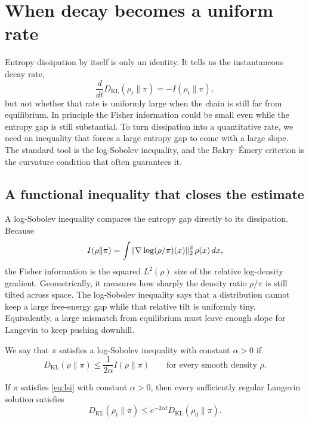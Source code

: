 \documentclass[11pt]{article}
\begin{document}
\section{When decay becomes a uniform rate}
\label{sec:lsi}

Entropy dissipation by itself is only an identity.
It tells us the instantaneous decay rate,
\[
\frac{d}{dt}D_{\mathrm{KL}}(\rho_t\|\pi)=-I(\rho_t\|\pi),
\]
but not whether that rate is uniformly large when the chain is still far from equilibrium.
In principle the Fisher information could be small even while the entropy gap is still substantial.
To turn dissipation into a quantitative rate, we need an inequality that forces a large entropy gap to come with a large slope.
The standard tool is the log-Sobolev inequality, and the Bakry--\'Emery criterion is the curvature condition that often guarantees it.

\subsection{A functional inequality that closes the estimate}
\label{subsec:lsi-decay}

A log-Sobolev inequality compares the entropy gap directly to its dissipation.
Because
\[
I(\rho\|\pi)=\int \lVert\nabla \log(\rho/\pi)(x)\rVert_2^2\,\rho(x)\,dx,
\]
the Fisher information is the squared $L^2(\rho)$ size of the relative log-density gradient.
Geometrically, it measures how sharply the density ratio $\rho/\pi$ is still tilted across space.
The log-Sobolev inequality says that a distribution cannot keep a large free-energy gap while that relative tilt is uniformly tiny.
Equivalently, a large mismatch from equilibrium must leave enough slope for Langevin to keep pushing downhill.

\begin{definition}
\label{def:lsi}
We say that $\pi$ satisfies a log-Sobolev inequality with constant $\alpha>0$ if
\begin{equation}
  D_{\mathrm{KL}}(\rho\|\pi)
  \le
  \frac{1}{2\alpha}I(\rho\|\pi)
  \qquad
  \text{for every smooth density }\rho.
  \label{eq:lsi}
\end{equation}
\end{definition}

\begin{proposition}
\label{prop:lsi-kl-decay}
If $\pi$ satisfies \eqref{eq:lsi} with constant $\alpha>0$, then every sufficiently regular Langevin solution satisfies
\begin{equation}
  D_{\mathrm{KL}}(\rho_t\|\pi)
  \le
  e^{-2\alpha t}D_{\mathrm{KL}}(\rho_0\|\pi).
  \label{eq:kl-exponential-decay}
\end{equation}
\end{proposition}
\end{document}
